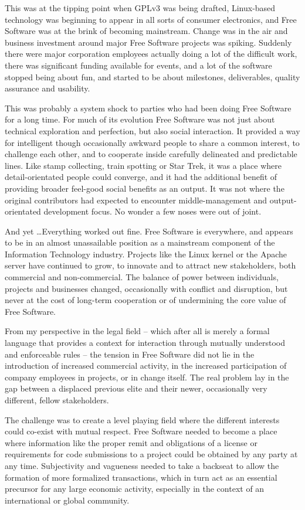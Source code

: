 This was at the tipping point when GPLv3 was being drafted, Linux-based technology was beginning to appear in all sorts of consumer electronics, and Free Software was at the brink of becoming mainstream. Change was in the air and business investment around major Free Software projects was spiking. Suddenly there were major corporation employees actually doing a lot of the difficult work, there was significant funding available for events, and a lot of the software stopped being about fun, and started to be about milestones, deliverables, quality assurance and usability.

This was probably a system shock to parties who had been doing Free Software for a long time. For much of its evolution Free Software was not just about technical exploration and perfection, but also social interaction. It provided a way for intelligent though occasionally awkward people to share a common interest, to challenge each other, and to cooperate inside carefully delineated and predictable lines. Like stamp collecting, train spotting or Star Trek, it was a place where detail-orientated people could converge, and it had the additional benefit of providing broader feel-good social benefits as an output. It was not where the original contributors had expected to encounter middle-management and output-orientated development focus. No wonder a few noses were out of joint.

And yet \dots Everything worked out fine. Free Software is everywhere, and appears to be in an almost unassailable position as a mainstream component of the Information Technology industry. Projects like the Linux kernel or the Apache server have continued to grow, to innovate and to attract new stakeholders, both commercial and non-commercial. The balance of power between individuals, projects and businesses changed, occasionally with conflict and disruption, but never at the cost of long-term cooperation or of undermining the core value of Free Software.

From my perspective in the legal field -- which after all is merely a formal language that provides a context for interaction through mutually understood and enforceable rules -- the tension in Free Software did not lie in the introduction of increased commercial activity, in the increased participation of company employees in projects, or in change itself. The real problem lay in the gap between a displaced previous elite and their newer, occasionally very different, fellow stakeholders.

The challenge was to create a level playing field where the different interests could co-exist with mutual respect. Free Software needed to become a place where information like the proper remit and obligations of a license or requirements for code submissions to a project could be obtained by any party at any time. Subjectivity and vagueness needed to take a backseat to allow the formation of more formalized transactions, which in turn act as an essential precursor for any large economic activity, especially in the context of an international or global community.

